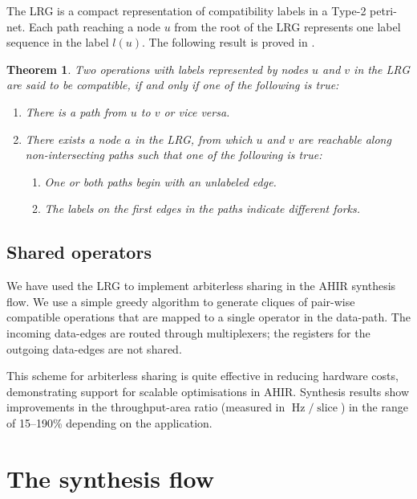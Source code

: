\documentclass[conference]{IEEEtran}
\newtheorem{theorem}{Theorem}[section]
\begin{document}
The LRG is a compact representation of compatibility labels in a
Type-2 petri-net. Each path reaching a node $u$ from the root of the
LRG represents one label sequence in the label $l(u)$. The following
result is proved in \cite{ahir_thesis}.

\begin{theorem}

  Two operations with labels represented by nodes $u$ and $v$ in the
  LRG are said to be compatible, if and only if one of the following
  is true:

\begin{enumerate}
  \item There is a path from $u$ to $v$ or \emph{vice versa}.
  \item There exists a node $a$ in the LRG, from which $u$ and $v$ are
        reachable along non-intersecting paths such that one of the
        following is true:
    \begin{enumerate}
      \item One or both paths begin with an unlabeled edge.
      \item The labels on the first edges in the paths indicate
            different forks.
    \end{enumerate}
\end{enumerate}
\label{theorem:compatibility-LRG}
\end{theorem}

\subsection{Shared operators}

We have used the LRG to implement arbiterless sharing in the AHIR
synthesis flow. We use a simple greedy algorithm to generate cliques
of pair-wise compatible operations that are mapped to a single
operator in the data-path. The incoming data-edges are routed through
multiplexers; the registers for the outgoing data-edges are not
shared.

This scheme for arbiterless sharing is quite effective in reducing
hardware costs, demonstrating support for scalable optimisations in
AHIR. Synthesis results show improvements in the throughput-area ratio
(measured in $\operatorname{Hz}/\operatorname{slice}$) in the range of
15--190\% depending on the application\cite{ahir_thesis}.

\section{The synthesis flow}
\end{document}
